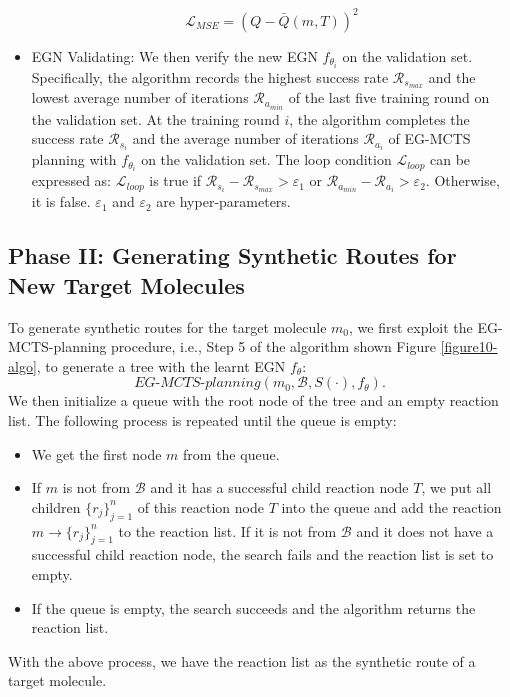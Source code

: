 \documentclass[sn-mathphys,Numbered]{sn-jnl}
\begin{document}
\begin{itemize}
        \begin{equation}
        \mathcal{L}_{MSE}=\left( Q-\bar{Q}(m,T) \right)^2
        \end{equation}
    \item EGN Validating: We then verify the new EGN $f_{\theta_{i}}$  on the validation set. Specifically, the algorithm records the highest success rate $\mathcal{R}_{s_{max}}$ and the lowest average number of iterations $\mathcal{R}_{a_{min}}$ of the last five training round on the validation set. At the training round $i$, the algorithm completes the success rate $\mathcal{R}_{s_{i}}$ and the average number of iterations $\mathcal{R}_{a_{i}}$ of EG-MCTS planning with $f_{\theta_{i}}$ on the validation set. The loop condition $\mathcal{L}_{loop}$ can be expressed as: $\mathcal{L}_{loop}$ is true if $\mathcal{R}_{s_{i}}-\mathcal{R}_{s_{max}}>\varepsilon_{1}$ or $\mathcal{R}_{a_{min}}-\mathcal{R}_{a_{i}}>\varepsilon_{2}$. Otherwise, it is false. $\varepsilon_{1}$ and $\varepsilon_{2}$ are hyper-parameters.
\end{itemize}



\subsection{Phase II: Generating Synthetic Routes for New Target Molecules}
To generate synthetic routes for the target molecule $m_0$, we first exploit the EG-MCTS-planning procedure, i.e., Step 5 of the algorithm shown Figure \ref{figure10-algo}, to generate a tree with the learnt EGN $f_{\theta}$: \[EG\textrm{-}MCTS\textrm{-} planning(m_0,\mathcal{B},S(\cdot),f_{\theta}).\] We then initialize a queue with the root node of the tree and an empty reaction list.
The following process is repeated until the queue is empty: 
\begin{itemize}
    \item We get the first node $m$ from the queue.
    \item If $m$ is not from $\mathcal{B}$ and it has a successful child reaction node $T$, we put all children $\{r_j\}_{j=1}^n$ of this reaction node $T$ into the queue and add the reaction $m \rightarrow \{r_j\}_{j=1}^n$ to the reaction list. If it is not from $\mathcal{B}$ and it does not have a successful child reaction node, the search fails and the reaction list is set to empty.
    
    \item If the queue is empty, the search succeeds and the algorithm returns the reaction list.
\end{itemize}
With the above process, we have the reaction list as the synthetic route of a target molecule.
\end{document}
